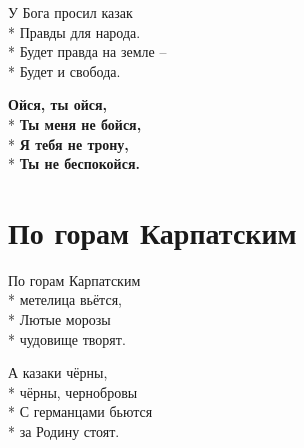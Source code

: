 \medskip

\begin{minipage}{\linewidth}
У Бога просил казак\\*
Правды для народа.\\*
Будет правда на земле –\\*
Будет и свобода.\\
\end{minipage}\par\medskip\nobreak

\medskip

\begin{minipage}{\linewidth}
\hspace*{1.5em}\textbf{Ойся, ты ойся,}\\*
\hspace*{1.5em}\textbf{Ты меня не бойся,}\\*
\hspace*{1.5em}\textbf{Я тебя не трону,}\\*
\hspace*{1.5em}\textbf{Ты не беспокойся.}\\
\end{minipage}

\vspace{\fill}\newpage

\section{По горам Карпатским}
\label{song:По_горам_Карпатским}

\medskip

\begin{minipage}{\linewidth}
По горам Карпатским\\*
метелица вьётся,\\*
Лютые морозы\\*
чудовище творят.\\
\end{minipage}\par\medskip\nobreak

\medskip

\begin{minipage}{\linewidth}
А казаки чёрны,\\*
чёрны, чернобровы\\*
С германцами бьются\\*
за Родину стоят.\\
\end{minipage}\par\medskip\nobreak

